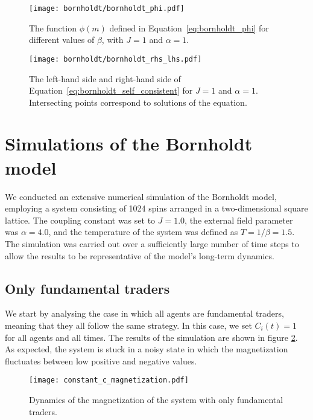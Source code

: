 \begin{figure}[h]
    \centering
    \begin{minipage}[t]{0.45\textwidth}
        \centering
        \texttt{[image: bornholdt/bornholdt\_phi.pdf]}
        \caption{The function $\phi(m)$ defined in Equation~\ref{eq:bornholdt_phi} for different values of $\beta$, with $J=1$ and $\alpha=1$.}
        \label{fig:bornholdt_phi}
    \end{minipage}
    \hfill
    \begin{minipage}[t]{0.45\textwidth}
        \centering
        \texttt{[image: bornholdt/bornholdt\_rhs\_lhs.pdf]}
        \caption{The left-hand side and right-hand side of Equation~\ref{eq:bornholdt_self_consistent} for $J=1$ and $\alpha=1$. Intersecting points correspond to solutions of the equation.}
        \label{fig:bornholdt_rhs_lhs}
    \end{minipage}
\end{figure}

\section{Simulations of the Bornholdt model}
We conducted an extensive numerical simulation of the Bornholdt model, employing a system consisting of 1024 spins arranged in a two-dimensional square lattice. The coupling constant was set to $J=1.0$, the external field parameter was $\alpha=4.0$, and the temperature of the system was defined as $T=1/\beta=1.5$. The simulation was carried out over a sufficiently large number of time steps to allow the results to be representative of the model's long-term dynamics.

\subsection{Only fundamental traders}
We start by analysing the case in which all agents are fundamental traders, meaning that they all follow the same strategy. In this case, we set $C_i(t) = 1$ for all agents and all times. The results of the simulation are shown in figure \ref{fig:fundamental_traders}. As expected, the system is stuck in a noisy state in which the magnetization fluctuates between low positive and negative values.

\begin{figure}[H]
    \centering
    \texttt{[image: constant\_c\_magnetization.pdf]}
    \caption{Dynamics of the magnetization of the system with only fundamental traders.}
    \label{fig:fundamental_traders}
\end{figure}

